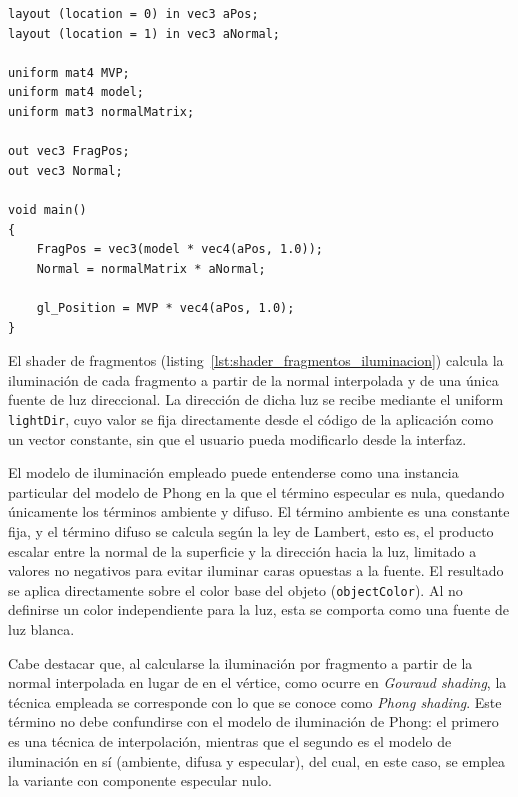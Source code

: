 \begin{listing}[htb]
\begin{verbatim}
layout (location = 0) in vec3 aPos;
layout (location = 1) in vec3 aNormal;

uniform mat4 MVP;
uniform mat4 model;
uniform mat3 normalMatrix;

out vec3 FragPos;
out vec3 Normal;

void main()
{
    FragPos = vec3(model * vec4(aPos, 1.0));
    Normal = normalMatrix * aNormal;

    gl_Position = MVP * vec4(aPos, 1.0);
}
\end{verbatim}
\caption{Shader de vértices del programa de iluminación.}
\label{lst:shader_vertices_iluminacion}
\end{listing}

El shader de fragmentos (listing~\ref{lst:shader_fragmentos_iluminacion}) calcula la iluminación de cada fragmento a partir de la normal interpolada y de una única fuente de luz direccional. La dirección de dicha luz se recibe mediante el uniform \texttt{lightDir}, cuyo valor se fija directamente desde el código de la aplicación como un vector constante, sin que el usuario pueda modificarlo desde la interfaz.

El modelo de iluminación empleado puede entenderse como una instancia particular del modelo de Phong en la que el término especular es nula, quedando únicamente los términos ambiente y difuso. El término ambiente es una constante fija, y el término difuso se calcula según la ley de Lambert, esto es, el producto escalar entre la normal de la superficie y la dirección hacia la luz, limitado a valores no negativos para evitar iluminar caras opuestas a la fuente. El resultado se aplica directamente sobre el color base del objeto (\texttt{objectColor}). Al no definirse un color independiente para la luz, esta se comporta como una fuente de luz blanca.

Cabe destacar que, al calcularse la iluminación por fragmento a partir de la normal interpolada en lugar de en el vértice, como ocurre en \emph{Gouraud shading}, la técnica empleada se corresponde con lo que se conoce como \emph{Phong shading}. Este término no debe confundirse con el modelo de iluminación de Phong: el primero es una técnica de interpolación, mientras que el segundo es el modelo de iluminación en sí (ambiente, difusa y especular), del cual, en este caso, se emplea la variante con componente especular nulo.

